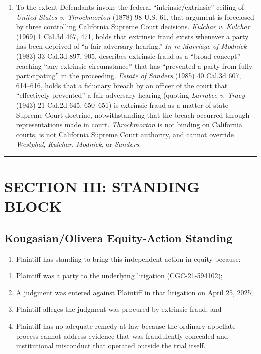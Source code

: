 \begin{enumerate}
\def\labelenumi{\arabic{enumi}.}
\setcounter{enumi}{12}
\tightlist
\item
  To the extent Defendants invoke the federal ``intrinsic/extrinsic'' ceiling of \emph{United States v. Throckmorton} (1878) 98 U.S. 61, that argument is foreclosed by three controlling California Supreme Court decisions. \emph{Kulchar v. Kulchar} (1969) 1 Cal.3d 467, 471, holds that extrinsic fraud exists whenever a party has been deprived of ``a fair adversary hearing.'' \emph{In re Marriage of Modnick} (1983) 33 Cal.3d 897, 905, describes extrinsic fraud as a ``broad concept'' reaching ``any extrinsic circumstance'' that has ``prevented a party from fully participating'' in the proceeding. \emph{Estate of Sanders} (1985) 40 Cal.3d 607, 614--616, holds that a fiduciary breach by an officer of the court that ``effectively prevented'' a fair adversary hearing (quoting \emph{Larrabee v. Tracy} (1943) 21 Cal.2d 645, 650--651) is extrinsic fraud as a matter of state Supreme Court doctrine, notwithstanding that the breach occurred through representations made in court. \emph{Throckmorton} is not binding on California courts, is not California Supreme Court authority, and cannot override \emph{Westphal}, \emph{Kulchar}, \emph{Modnick}, or \emph{Sanders}.
\end{enumerate}

\begin{center}\rule{0.5\linewidth}{0.5pt}\end{center}

\label{toc:section-iii-standing-block}
\section{SECTION III: STANDING BLOCK}\label{section-iii-standing-block}

\subsection{Kougasian/Olivera Equity-Action Standing}\label{kougasianolivera-equity-action-standing}

\begin{enumerate}
\def\labelenumi{\arabic{enumi}.}
\setcounter{enumi}{13}
\tightlist
\item
  Plaintiff has standing to bring this independent action in equity because:
\end{enumerate}

\begin{enumerate}
\def\labelenumi{(\alph{enumi})}
\item
  Plaintiff was a party to the underlying litigation (CGC-21-594102);
\item
  A judgment was entered against Plaintiff in that litigation on April 25, 2025;
\item
  Plaintiff alleges the judgment was procured by extrinsic fraud; and
\item
  Plaintiff has no adequate remedy at law because the ordinary appellate process cannot address evidence that was fraudulently concealed and institutional misconduct that operated outside the trial itself.
\end{enumerate}

